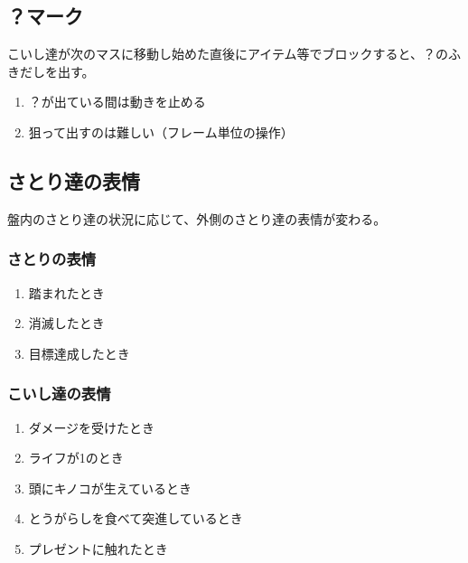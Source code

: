 

\subsection{？\hspace{0pt}マーク}
こいし達が次のマスに移動し始めた直後にアイテム等でブロックすると、？\hspace{0pt}のふきだしを出す。
\begin{enumerate}[label={\sarrow}]
\item ？\hspace{0pt}が出ている間は動きを止める
\item 狙って出すのは難しい（フレーム単位の操作）
\end{enumerate}



\subsection{さとり達の表情}
盤内のさとり達の状況に応じて、外側のさとり達の表情が変わる。

\subsubsection{さとりの表情}
\begin{enumerate}[label={\sarrow}]
\item 踏まれたとき
\item 消滅したとき
\item 目標達成したとき
\end{enumerate}

\subsubsection{こいし達の表情}
\begin{enumerate}[label={\sarrow}]
\item ダメージを受けたとき
\item ライフが1のとき
\item 頭にキノコが生えているとき
\item とうがらしを食べて突進しているとき
\item プレゼントに触れたとき
\end{enumerate}


